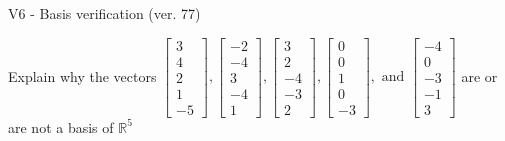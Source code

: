 \begin{exercise}
  \begin{exerciseTitle}V6 - Basis verification (ver. 77)\end{exerciseTitle}
  \begin{exerciseStatement}
    Explain why the vectors \(\left[\begin{array}{r}
3 \\
4 \\
2 \\
1 \\
-5
\end{array}\right] , \left[\begin{array}{r}
-2 \\
-4 \\
3 \\
-4 \\
1
\end{array}\right] , \left[\begin{array}{r}
3 \\
2 \\
-4 \\
-3 \\
2
\end{array}\right] , \left[\begin{array}{r}
0 \\
0 \\
1 \\
0 \\
-3
\end{array}\right] , \text{ and } \left[\begin{array}{r}
-4 \\
0 \\
-3 \\
-1 \\
3
\end{array}\right]\) are or are not a basis of \(\mathbb{R}^5\)	



\end{exerciseStatement}
\end{exercise}
